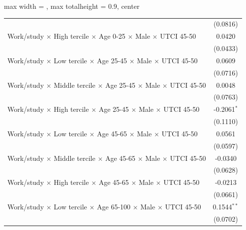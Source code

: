 \begin{table}[htbp]
\begin{adjustbox}{max width = \textwidth, max totalheight = 0.9\textheight, center}
\begin{tabular}{lc}
                                                                                                        & (0.0816)\\   
         Work/study $\times$ High tercile $\times$ Age 0-25 $\times$ Male $\times$ UTCI 45-50           & 0.0420\\   
                                                                                                        & (0.0433)\\   
         Work/study $\times$ Low tercile $\times$ Age 25-45 $\times$ Male $\times$ UTCI 45-50           & 0.0609\\   
                                                                                                        & (0.0716)\\   
         Work/study $\times$ Middle tercile $\times$ Age 25-45 $\times$ Male $\times$ UTCI 45-50        & 0.0048\\   
                                                                                                        & (0.0763)\\   
         Work/study $\times$ High tercile $\times$ Age 25-45 $\times$ Male $\times$ UTCI 45-50          & -0.2061$^{*}$\\   
                                                                                                        & (0.1110)\\   
         Work/study $\times$ Low tercile $\times$ Age 45-65 $\times$ Male $\times$ UTCI 45-50           & 0.0561\\   
                                                                                                        & (0.0597)\\   
         Work/study $\times$ Middle tercile $\times$ Age 45-65 $\times$ Male $\times$ UTCI 45-50        & -0.0340\\   
                                                                                                        & (0.0628)\\   
         Work/study $\times$ High tercile $\times$ Age 45-65 $\times$ Male $\times$ UTCI 45-50          & -0.0213\\   
                                                                                                        & (0.0661)\\   
         Work/study $\times$ Low tercile $\times$ Age 65-100 $\times$ Male $\times$ UTCI 45-50          & 0.1544$^{**}$\\   
                                                                                                        & (0.0702)\\   

\end{tabular}
\end{adjustbox}
\end{table}
